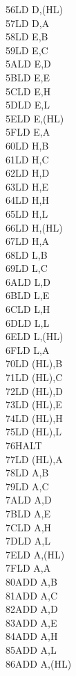 \documentclass[oneside,a4paper]{book}
\begin{document}
\begin{multicols}{3}
{\begin{tabbing}
56\>LD D,(HL)\\
57\>LD D,A\\
58\>LD E,B\\
59\>LD E,C\\
5A\>LD E,D\\
5B\>LD E,E\\
5C\>LD E,H\\
5D\>LD E,L\\
5E\>LD E,(HL)\\
5F\>LD E,A\\
60\>LD H,B\\
61\>LD H,C\\
62\>LD H,D\\
63\>LD H,E\\
64\>LD H,H\\
65\>LD H,L\\
66\>LD H,(HL)\\
67\>LD H,A\\
68\>LD L,B\\
69\>LD L,C\\
6A\>LD L,D\\
6B\>LD L,E\\
6C\>LD L,H\\
6D\>LD L,L\\
6E\>LD L,(HL)\\
6F\>LD L,A\\
70\>LD (HL),B\\
71\>LD (HL),C\\
72\>LD (HL),D\\
73\>LD (HL),E\\
74\>LD (HL),H\\
75\>LD (HL),L\\
76\>HALT\\
77\>LD (HL),A\\
78\>LD A,B\\
79\>LD A,C\\
7A\>LD A,D\\
7B\>LD A,E\\
7C\>LD A,H\\
7D\>LD A,L\\
7E\>LD A,(HL)\\
7F\>LD A,A\\
80\>ADD A,B\\
81\>ADD A,C\\
82\>ADD A,D\\
83\>ADD A,E\\
84\>ADD A,H\\
85\>ADD A,L\\
86\>ADD A,(HL)\\

\end{tabbing}}
\end{multicols}
\end{document}
